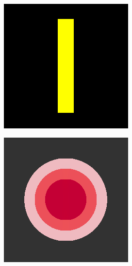 \begin{figure}[H]
	\centering
	\begin{subfigure}{0.4\linewidth}
		\centering
		\includegraphics[width=0.8\linewidth]{image/result_ex1/splitbergman01.png}
	\end{subfigure}
	\begin{subfigure}{0.4\linewidth}
		\centering
		\includegraphics[width=0.8\linewidth]{image/result_ex1/splitbergman02.png}
	\end{subfigure}
	\begin{subfigure}{0.4\linewidth}
		\centering

\end{subfigure}
\end{figure}
